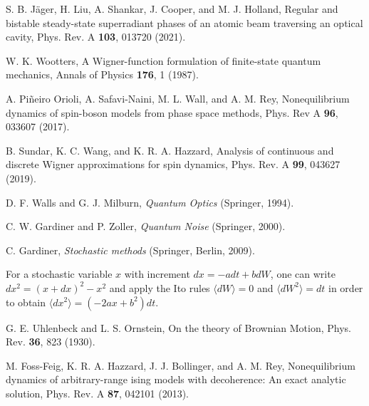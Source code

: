\documentclass[pra,twocolumn,showpacs,preprintnumbers,amsmath,amssymb,superscriptaddress]{revtex4-1}
\begin{document}
\begin{thebibliography}{99}
 S. B. J\"ager, H. Liu, A. Shankar, J. Cooper, and M. J. Holland, Regular and bistable steady-state superradiant phases of an atomic beam traversing an optical cavity, Phys. Rev. A {\bf 103}, 013720 (2021).	
	
	
 W. K. Wootters, A Wigner-function formulation of finite-state quantum mechanics, Annals of Physics {\bf 176}, 1 (1987).	

A. Pi\~neiro Orioli, A. Safavi-Naini, M. L. Wall, and A. M. Rey, Nonequilibrium dynamics of spin-boson models from phase space methods, Phys. Rev A {\bf 96}, 033607 (2017).


	


 B. Sundar, K. C. Wang, and K. R. A. Hazzard, Analysis of continuous and discrete Wigner approximations for spin dynamics, Phys. Rev. A {\bf 99}, 043627 (2019).

 D. F. Walls and G. J. Milburn, {\it Quantum Optics} (Springer, 1994).	

 C. W. Gardiner and P. Zoller, {\it Quantum Noise} (Springer, 2000).

 C. Gardiner, {\it Stochastic methods} (Springer, Berlin, 2009).



 For a stochastic variable $x$ with increment $dx =- a dt + b dW$, one can write  $dx^2=(x+dx)^2-x^2$ and apply  the Ito rules $\langle dW\rangle =0$ and $\langle dW^2\rangle=dt$ in order to obtain $\langle dx^2\rangle =(- 2a x + b^2) dt$. 

 G. E. Uhlenbeck and L. S. Ornstein, On the theory of Brownian Motion, Phys. Rev. {\bf 36}, 823 (1930).


		
		
 M. Foss-Feig, K. R. A. Hazzard, J. J. Bollinger, and A. M. Rey, Nonequilibrium dynamics of arbitrary-range ising models with decoherence: An exact analytic solution, Phys. Rev. A {\bf 87}, 042101 (2013).
	

\end{thebibliography}
\end{document}
